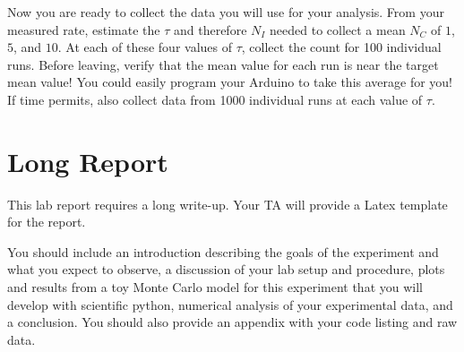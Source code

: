 \documentclass[12pt]{article}
\begin{document}
Now you are ready to collect the data you will use for your analysis.  From your measured rate, estimate the $\tau$ and therefore $N_I$ needed to collect a mean $N_C$ of $1$,$5$, and $10$.  At each of these four values of $\tau$, collect the count for 100 individual runs.  Before leaving, verify that the mean value for each run is near the target mean value!  You could easily program your Arduino to take this average for you!  If time permits, also collect data from 1000 individual runs at each value of $\tau$.

\section{Long Report}

This lab report requires a long write-up.  Your TA will provide a Latex template for the report.  

You should include an introduction describing the goals of the experiment and what you expect to observe, a discussion of your lab setup and procedure, plots and results from a toy Monte Carlo model for this experiment that you will develop with scientific python, numerical analysis of your experimental data, and a conclusion.  You should also provide an appendix with your code listing and raw data.
\end{document}
